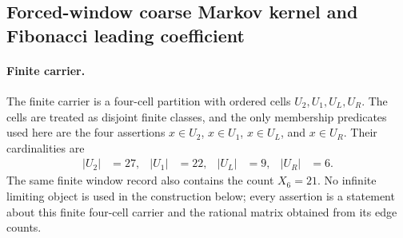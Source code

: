 
\subsection{Forced-window coarse Markov kernel and Fibonacci leading coefficient}
\label{sec:window6-markov-kernel-coarse-spectrum-fibonacci-leading}

\paragraph{Finite carrier.}
The finite carrier is a four-cell partition with ordered cells
$U_2,U_1,U_L,U_R$.  The cells are treated as disjoint finite classes, and the only membership predicates used here are the four assertions $x\in U_2$, $x\in U_1$, $x\in U_L$, and $x\in U_R$.  Their cardinalities are
$$
\begin{aligned}
|U_2|&=27, & |U_1|&=22, & |U_L|&=9, & |U_R|&=6.
\end{aligned}
$$
The same finite window record also contains the count $X_6=21$.  No infinite limiting object is used in the construction below; every assertion is a statement about this finite four-cell carrier and the rational matrix obtained from its edge counts.

